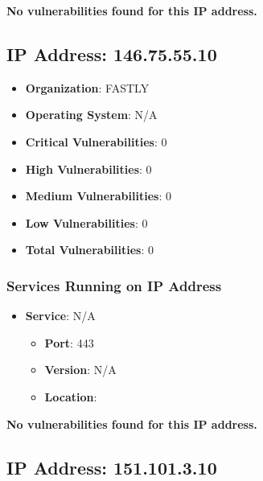 \documentclass{article}
\begin{document}
\textbf{No vulnerabilities found for this IP address.}




\clearpage



\subsection*{IP Address: 146.75.55.10}

\begin{itemize}
    \item \textbf{Organization}: FASTLY
    \item \textbf{Operating System}:  N/A 
    \item \textbf{Critical Vulnerabilities}: 0
    \item \textbf{High Vulnerabilities}: 0
    \item \textbf{Medium Vulnerabilities}: 0
    \item \textbf{Low Vulnerabilities}: 0
    \item \textbf{Total Vulnerabilities}: 0
\end{itemize}

\subsubsection*{Services Running on IP Address}

\begin{itemize}
    
        \item \textbf{Service}: N/A
        \begin{itemize}
            \item \textbf{Port}: 443
            \item \textbf{Version}:  N/A 
            \item \textbf{Location}: \href{  }{  }
        \end{itemize}
    
\end{itemize}


\textbf{No vulnerabilities found for this IP address.}




\clearpage



\subsection*{IP Address: 151.101.3.10}
\end{document}
